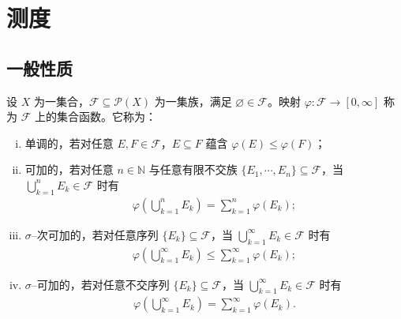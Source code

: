\documentclass[../../main.tex]{subfiles}%
\begin{document}
\section{测度}\label{section:ch01-测度}

\subsection{一般性质}\label{subsection:ch01-测度一般性质}

\begin{definition}\label{definition:ch01-集合函数性质}
设 $X$ 为一集合，$\mathcal{F}\subseteq\mathcal{P}(X)$ 为一集族，满足 $\varnothing \in\mathcal{F}$。映射 $\varphi:\mathcal{F}\to[0,\infty]$ 称为 $\mathcal{F}$ 上的集合函数。它称为：
\begin{enumerate}[(i)]
\item 单调的，若对任意 $E,F\in\mathcal{F}$，$E\subseteq F$ 蕴含 $\varphi(E)\leqslant\varphi(F)$；
\item 可加的，若对任意 $n\in\mathbb{N}$ 与任意有限不交族 $\{E_1,\cdots ,E_n\}\subseteq\mathcal{F}$，当 $\bigcup_{k=1}^nE_k\in\mathcal{F}$ 时有
\begin{align*}
\varphi\left(\bigcup_{k=1}^nE_k\right)=\sum_{k=1}^n\varphi(E_k);
\end{align*}
\item $\sigma$--次可加的，若对任意序列 $\{E_k\}\subseteq\mathcal{F}$，当 $\bigcup_{k=1}^\infty E_k\in\mathcal{F}$ 时有
\begin{align*}
\varphi\left(\bigcup_{k=1}^\infty E_k\right)\leqslant\sum_{k=1}^\infty\varphi(E_k);
\end{align*}
\item $\sigma$--可加的，若对任意不交序列 $\{E_k\}\subseteq\mathcal{F}$，当 $\bigcup_{k=1}^\infty E_k\in\mathcal{F}$ 时有
\begin{align*}
\varphi\left(\bigcup_{k=1}^\infty E_k\right)=\sum_{k=1}^\infty\varphi(E_k).
\end{align*}
\end{enumerate}
\end{definition}
\end{document}

